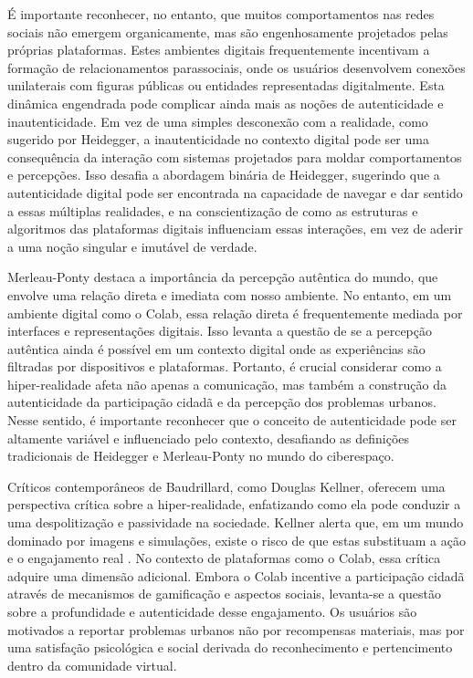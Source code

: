 É importante reconhecer, no entanto, que muitos comportamentos nas redes sociais não emergem organicamente, mas são engenhosamente projetados pelas próprias plataformas. Estes ambientes digitais frequentemente incentivam a formação de relacionamentos parassociais, onde os usuários desenvolvem conexões unilaterais com figuras públicas ou entidades representadas digitalmente. Esta dinâmica engendrada pode complicar ainda mais as noções de autenticidade e inautenticidade. Em vez de uma simples desconexão com a realidade, como sugerido por Heidegger, a inautenticidade no contexto digital pode ser uma consequência da interação com sistemas projetados para moldar comportamentos e percepções. Isso desafia a abordagem binária de Heidegger, sugerindo que a autenticidade digital pode ser encontrada na capacidade de navegar e dar sentido a essas múltiplas realidades, e na conscientização de como as estruturas e algoritmos das plataformas digitais influenciam essas interações, em vez de aderir a uma noção singular e imutável de verdade.


Merleau-Ponty destaca a importância da percepção autêntica do mundo, que envolve uma relação direta e imediata com nosso ambiente. No entanto, em um ambiente digital como o Colab, essa relação direta é frequentemente mediada por interfaces e representações digitais. Isso levanta a questão de se a percepção autêntica ainda é possível em um contexto digital onde as experiências são filtradas por dispositivos e plataformas. Portanto, é crucial considerar como a hiper-realidade afeta não apenas a comunicação, mas também a construção da autenticidade da participação cidadã e da percepção dos problemas urbanos. Nesse sentido, é importante reconhecer que o conceito de autenticidade pode ser altamente variável e influenciado pelo contexto, desafiando as definições tradicionais de Heidegger e Merleau-Ponty no mundo do ciberespaço.

Críticos contemporâneos de Baudrillard, como Douglas Kellner, oferecem uma perspectiva crítica sobre a hiper-realidade, enfatizando como ela pode conduzir a uma despolitização e passividade na sociedade. Kellner alerta que, em um mundo dominado por imagens e simulações, existe o risco de que estas substituam a ação e o engajamento real \cite{1995_Kellner_BOOK}. No contexto de plataformas como o Colab, essa crítica adquire uma dimensão adicional. Embora o Colab incentive a participação cidadã através de mecanismos de gamificação e aspectos sociais, levanta-se a questão sobre a profundidade e autenticidade desse engajamento. Os usuários são motivados a reportar problemas urbanos não por recompensas materiais, mas por uma satisfação psicológica e social derivada do reconhecimento e pertencimento dentro da comunidade virtual.

